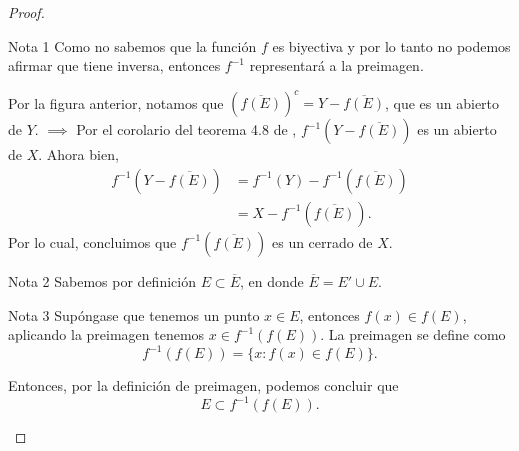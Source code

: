 \begin{proof}
\begin{center}
\end{center}

\begin{noter}{Nota 1}
 Como no sabemos que la función $f$ es biyectiva y por lo tanto no podemos afirmar que tiene inversa, entonces $f^{-1}$ representará a la preimagen.
\end{noter}
Por la figura anterior, notamos que $\left(\overline{f(E)}\right)^c=Y-\overline{f(E)}$, que es un abierto de $Y$.
 $\implies$ Por el corolario del teorema 4.8 de \cite{rudin1976principles}, $f^{-1}(Y-\overline{f(E)})$ es un abierto de $X$. Ahora bien, 
 \begin{align*}
     f^{-1}(Y-\overline{f(E)}) &=f^{-1}(Y)-f^{-1}\left(\overline{f(E)}\right)\\
     &= X-f^{-1}\left(\overline{f(E)}\right).
 \end{align*}
Por lo cual, concluimos que $f^{-1}\left(\overline{f(E)}\right)$ es un cerrado de $X$. 
 
\begin{noter}{Nota 2}
Sabemos por definición $E\subset \overline{E}$, en donde $\overline{E}=E'\cup E$.
\end{noter} 
 
 \begin{noter}{Nota 3}
  Supóngase que tenemos un punto $x\in E$, entonces $f(x)\in f(E)$, aplicando la preimagen tenemos $x\in f^{-1}\left(f(E)\right)$. La preimagen se define como $$f^{-1}(f(E))=\{x:f(x)\in f(E)\}.$$
  
  Entonces, por la definición de preimagen, podemos concluir que $$E\subset f^{-1}(f(E)).$$
 \end{noter}
 

\end{proof}
